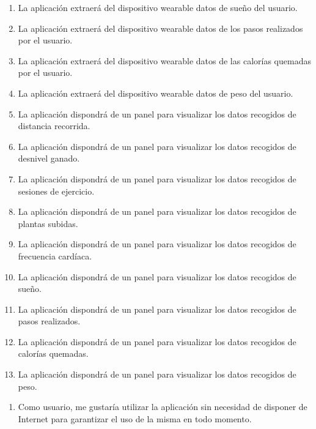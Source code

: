 \begin{enumerate}[resume=req-usuario,label=\textbf{\texttt{RU-\arabic*}}]
\begin{enumerate}[resume=req-funcionales,label=\textbf{\texttt{RF-\arabic*}}]
                \item La aplicación extraerá del dispositivo \gls{wearable} datos de sueño del usuario.
                \item La aplicación extraerá del dispositivo \gls{wearable} datos de los pasos realizados por el usuario.
                \item La aplicación extraerá del dispositivo \gls{wearable} datos de las calorías quemadas por el usuario.
                \item La aplicación extraerá del dispositivo \gls{wearable} datos de peso del usuario.
                \item La aplicación dispondrá de un panel para visualizar los datos recogidos de distancia recorrida.
                \item La aplicación dispondrá de un panel para visualizar los datos recogidos de desnivel ganado.
                \item La aplicación dispondrá de un panel para visualizar los datos recogidos de sesiones de ejercicio.
                \item La aplicación dispondrá de un panel para visualizar los datos recogidos de plantas subidas.
                \item La aplicación dispondrá de un panel para visualizar los datos recogidos de frecuencia cardíaca.
                \item La aplicación dispondrá de un panel para visualizar los datos recogidos de sueño.
                \item La aplicación dispondrá de un panel para visualizar los datos recogidos de pasos realizados.
                \item La aplicación dispondrá de un panel para visualizar los datos recogidos de calorías quemadas.
                \item La aplicación dispondrá de un panel para visualizar los datos recogidos de peso.
            \end{enumerate}
        \end{enumerate}
        \begin{enumerate}[resume=req-usuario,label=\textbf{\texttt{RU-\arabic*}}]
            \item Como usuario, me gustaría utilizar la aplicación sin necesidad de disponer de Internet para garantizar el uso de la misma en todo momento.
        \end{enumerate}
